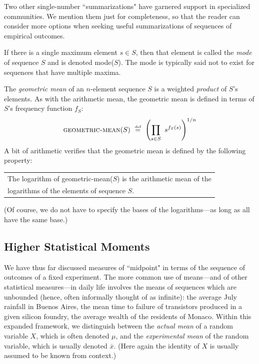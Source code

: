 Two other single-number ``summarizations" have garnered support in specialized communities.  We mention them just for completeness, so that the reader can consider more options when seeking useful summarizations of sequences of empirical outcomes.

\medskip

 

\noindent
If there is a single maximum element $s \in S$, then that element is called the {\em mode} of sequence $S$ and is denoted {\sc mode}($S$).  The mode is typically said not to exist for sequences that have multiple maxima.

\medskip

   

\noindent
The {\it geometric mean} of an $n$-element sequence $S$ is a weighted {\em product} of $S$'s elements.  As with the arithmetic mean, the geometric mean is defined in terms of $S$'s frequency function $f_S$:
\[ \mbox{\sc geometric-mean}(S) \ \stackrel{\mbox{{\tiny def}}}{=} \  \left(\prod_{s \in S} \ s^{f_S(s)} \right)^{1/n} \]
A bit of arithmetic verifies that the geometric mean is defined by the following property:

\smallskip

{\em 
\begin{tabular}{l}
The logarithm of {\sc geometric-mean}($S$) is the arithmetic mean of the \\
logarithms of the elements of sequence $S$.
\end{tabular}
}

\smallskip

\noindent
(Of course, we do not have to specify the bases of the logarithms---as long as all have the same base.)
 
\subsection{Higher Statistical Moments}
\label{sec:mean-plus-moments}


We have thus far discussed measures of ``midpoint" in terms of the
sequence of outcomes of a fixed experiment.  The more common use of
means---and of other statistical measures---in daily life involves the
means of sequences which are unbounded (hence, often informally
thought of as infinite): the average July rainfall in Buenos Aires, the mean time to failure of transistors produced in a given silicon foundry, the average wealth of the residents of Monaco.  Within this expanded framework, we distinguish between the {\em actual mean} of a random variable $X$, which is often denoted $\mu$, and the {\em experimental mean} of the random variable, which is usually denoted $\bar{x}$.  (Here again the identity of $X$ is usually assumed to be known from context.)

